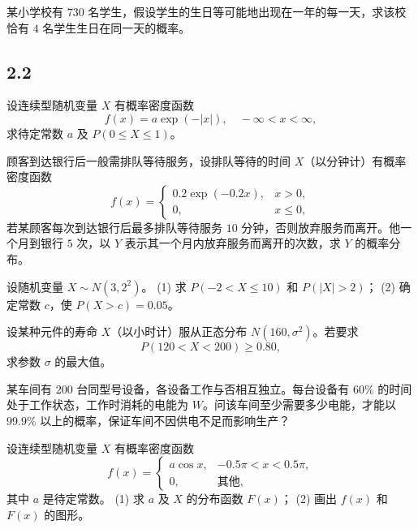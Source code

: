 \begin{homework}[2.13]
某小学校有 $730$ 名学生，假设学生的生日等可能地出现在一年的每一天，求该校恰有 $4$ 名学生生日在同一天的概率。
\end{homework}
\subsection*{2.2}

\begin{homework}[2.15]
设连续型随机变量 $X$ 有概率密度函数
\[
f(x) = a \exp(-|x|), \quad -\infty < x < \infty,
\]
求待定常数 $a$ 及 $P(0 \leq X \leq 1)$。
\end{homework}

\begin{homework}[2.17]
顾客到达银行后一般需排队等待服务，设排队等待的时间 $X$（以分钟计）有概率密度函数
\[
f(x) =
\begin{cases}
0.2 \exp(-0.2x), & x > 0, \\[6pt]
0, & x \leq 0,
\end{cases}
\]
若某顾客每次到达银行后最多排队等待服务 $10$ 分钟，否则放弃服务而离开。他一个月到银行 $5$ 次，以 $Y$ 表示其一个月内放弃服务而离开的次数，求 $Y$ 的概率分布。
\end{homework}

\begin{homework}[2.19]
设随机变量 $X \sim N(3, 2^2)$。  
(1) 求 $P(-2 < X \leq 10)$ 和 $P(|X| > 2)$；  
(2) 确定常数 $c$，使 $P(X > c) = 0.05$。
\end{homework}

\begin{homework}[2.21]
设某种元件的寿命 $X$（以小时计）服从正态分布 $N(160,\sigma^2)$。若要求
\[
P(120 < X < 200) \geq 0.80,
\]
求参数 $\sigma$ 的最大值。
\end{homework}

\begin{homework}[2.22]
某车间有 $200$ 台同型号设备，各设备工作与否相互独立。每台设备有 $60\%$ 的时间处于工作状态，工作时消耗的电能为 $W$。问该车间至少需要多少电能，才能以 $99.9\%$ 以上的概率，保证车间不因供电不足而影响生产？
\end{homework}

\begin{homework}[2.23]
设连续型随机变量 $X$ 有概率密度函数
\[
f(x) =
\begin{cases}
a \cos x, & -0.5\pi < x < 0.5\pi, \\[6pt]
0, & \text{其他},
\end{cases}
\]
其中 $a$ 是待定常数。  
(1) 求 $a$ 及 $X$ 的分布函数 $F(x)$；  
(2) 画出 $f(x)$ 和 $F(x)$ 的图形。
\end{homework}

